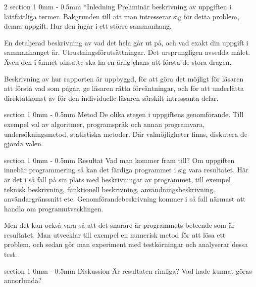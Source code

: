 \documentclass[a4paper]{article}
\makeatletter
\renewcommand{\section}{\@startsection
{section}%
{1}%
{0mm}%
{-\baselineskip}%
{0.5mm}%
{\normalfont\bfseries}} %
\makeatother
\begin{document}
\begin{multicols}{2}
  \section*{Inledning}
  Preliminär beskrivning av uppgiften  i lättfattliga termer. Bakgrunden
  till att man intresserar sig för detta problem, denna uppgift. Hur den
  ingår i ett större sammanhang.

  En detaljerad beskrivning av vad det hela går ut på, och vad exakt din
  uppgift   i    sammanhanget   är.    Utrustningsförutsättningar.   Det
  ursprungligen avsedda målet. Även den i ämnet oinsatte ska ha en ärlig
  chans att förstå de stora dragen.

  Beskrivning av hur rapporten är uppbyggd, för att göra det möjligt för
  läsaren att förstå vad som  pågår, ge läsaren rätta förväntningar, och
  för  att  underlätta direktåtkomst  av  för  den individuelle  läsaren
  särskilt intressanta delar.

  \section{Metod}
  De  olika  stegen  i  uppgiftens genomförande.  Till  exempel  val  av
  algoritmer,  programspråk och  annan programvara,  undersökningsmetod,
  statistiska  metoder. Där  valmöjligheter finns,  diskutera de  gjorda
  valen.

  \section{Resultat}
  Vad man  kommer fram till?  Om uppgiften innebär programmering  så kan
  det färdiga programmet i sig vara resultatet.  Här är det i så fall på
  sin  plats  med  beskrivningar  av programmet,  till  exempel  teknisk
  beskrivning,    funktionell    beskrivning,    användningsbeskrivning,
  användargränssnitt  etc.  Genomförandebeskrivning  kommer  i  så  fall
  närmast att handla om programutvecklingen.

  Men det kan också vara så  att det snarare är programmets beteende som
  är resultatet.  Man utvecklar till  exempel en numerisk metod  för att
  lösa ett problem,  och sedan gör man experiment  med testkörningar och
  analyserar dessa test.

  \section{Diskussion}
  Är resultaten rimliga? Vad hade kunnat göras annorlunda?


\end{multicols}
\end{document}
